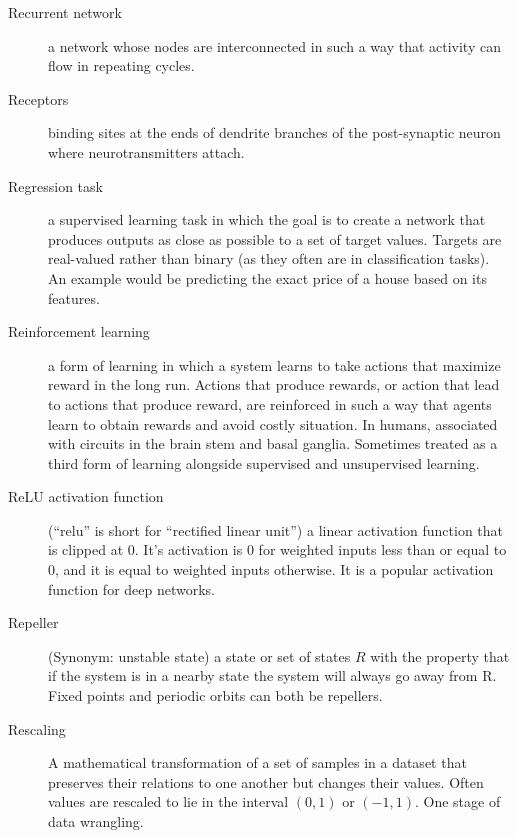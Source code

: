 \begin{description}
\item[Recurrent network] a network whose nodes are interconnected in such a way that activity can flow in repeating cycles.

\item[Receptors] binding sites at the ends of dendrite branches of the post-synaptic neuron where neurotransmitters attach.


\item[Regression task] a supervised learning task in which the goal is to create a network that produces outputs as close as possible to a set of target values. Targets are real-valued rather than binary (as they often are in classification tasks). An example would be predicting the exact price of a house based on its features.

\item[Reinforcement learning] a form of learning in which a system learns to take actions that maximize reward in the long run.   Actions that produce rewards, or action that lead to actions that produce reward, are reinforced in such a way that agents learn to obtain rewards and avoid costly situation.  In humans, associated with circuits in the brain stem and basal ganglia.  Sometimes treated as a third form of learning alongside supervised and unsupervised learning.

\item[ReLU activation function] (``relu'' is short for ``rectified linear unit'') a linear activation function that is clipped at  0. It's activation is 0 for weighted inputs less than or equal to 0, and it is equal to weighted inputs otherwise. It is a popular activation function for deep networks.

\item[Repeller] (Synonym: unstable state) a state or set of states $R$ with the property that if the system is in a nearby state the system will always go away from R. Fixed points and periodic orbits can both be repellers.

\item[Rescaling] A mathematical transformation of a set of samples in a dataset that preserves their relations to one another but changes their values. Often values are rescaled to lie in the interval $(0,1)$ or $(-1,1)$. One stage of data wrangling.



\end{description}
